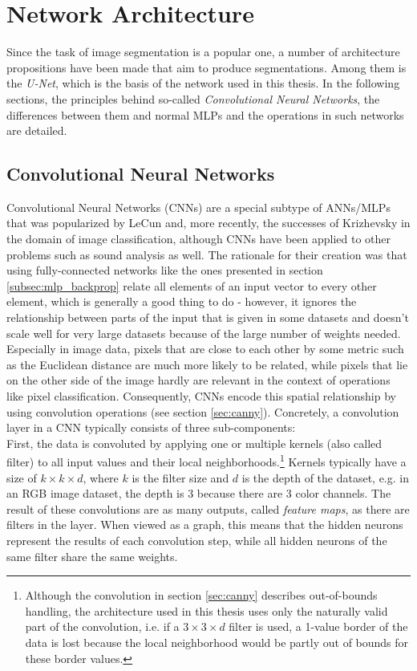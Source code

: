 \chapter {Network Architecture}

Since the task of image segmentation is a popular one, a number of architecture propositions have been made that aim to produce segmentations. Among them is the \textit{U-Net}, which is the basis of the network used in this thesis.  In the following sections, the principles behind so-called \textit{Convolutional Neural Networks}, the differences between them and normal MLPs and the operations in such networks are detailed.


	\section{Convolutional Neural Networks}
Convolutional Neural Networks (CNNs) are a special subtype of ANNs/MLPs that was popularized by LeCun \cite{lecun98} and, more recently, the successes of Krizhevsky \cite{krizhevsky2012} in the domain of image classification, although CNNs have been applied to other problems such as sound analysis as well. The rationale for their creation was that using fully-connected networks like the ones presented in section \ref{subsec:mlp_backprop} relate all elements of an input vector to every other element, which is generally a good thing to do - however, it ignores the relationship between parts of the input that is given in some datasets and doesn't scale well for very large datasets because of the large number of weights needed. Especially in image data, pixels that are close to each other by some metric such as the Euclidean distance are much more likely to be related, while pixels that lie on the other side of the image hardly are relevant in the context of operations like pixel classification. Consequently, CNNs encode this spatial relationship by using convolution operations (see section \ref{sec:canny}). Concretely, a convolution layer in a CNN typically consists of three sub-components:\\

\noindent First, the data is convoluted by applying one or multiple kernels (also called filter) to all input values and their local neighborhoods.\footnote{Although the convolution in section \ref{sec:canny} describes out-of-bounds handling, the architecture used in this thesis uses only the naturally valid part of the convolution, i.e. if a $3 \times 3 \times d$ filter is used, a 1-value border of the data is lost because the local neighborhood would be partly out of bounds for these border values.} Kernels typically have a size of $k \times k \times d$, where $k$ is the filter size and $d$ is the depth of the dataset, e.g. in an RGB image dataset, the depth is 3 because there are 3 color channels. The result of these convolutions are as many outputs, called \textit{feature maps}, as there are filters in the layer. When viewed as a graph, this means that the hidden neurons represent the results of each convolution step, while all hidden neurons of the same filter share the same weights.

